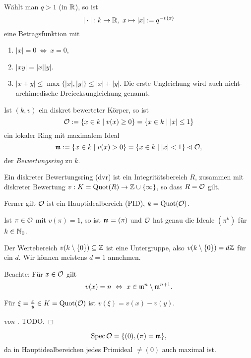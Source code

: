 \begin{bemerkung}
	Wählt man $q > 1$ (in $\mathbb{R}$), so ist
	\[
		|\cdot |: k \to \mathbb{R},\ x\mapsto |x| := q^{-v(x)}
	\]
	eine Betragsfunktion mit
	\begin{enumerate}
	  \item $|x| = 0 \ \Leftrightarrow\ x = 0$,
	  \item $|xy| = |x||y|$.
	  \item $|x+y| \leq \max \{ |x|,|y|\} \leq |x| + |y|$.
	   Die erste Ungleichung wird auch nicht-archimedische
	   Dreiecksungleichung genannt.
	\end{enumerate}
\end{bemerkung}


\begin{definition}[Bewertungsring]
	\label{def:bewertungsring}
	Ist $(k,v)$ ein diskret bewerteter Körper, so ist
	\[
		\mathcal{O}:= \{x\in k\mid v(x) \geq 0 \} = \{ x \in k \mid |x|\leq 1\}
	\]
	ein lokaler Ring mit maximalem Ideal
	\[
		\mathfrak{m} := \{x\in k\mid v(x) > 0\} = \{ x \in k\mid |x|< 1\} \vartriangleleft \mathcal{O},
	\]
	der \emph{Bewertungsring} zu $k$.
	
	Ein diskreter Bewertungsring (dvr) ist ein Integritätsbereich $R$,
	zusammen mit diskreter Bewertung $v: K = \operatorname{Quot}(R) \to \mathbb{Z} \cup \{\infty\}$,
	so dass $R = \mathcal{O}$ gilt.
	
	Ferner gilt $\mathcal{O}$ ist ein Hauptidealbereich (PID), $k = \operatorname{Quot}(\mathcal{O})$.
	
	Ist $\pi\in \mathcal{O}$ mit $v(\pi) = 1$, so ist 
	$\mathfrak{m} = (\pi)$ und $\mathcal{O}$ hat genau die Ideale $(\pi^k)$ für $k\in \mathbb{N}_0$.
\end{definition}


\begin{bemerkung}
	Der Wertebereich $v(k\setminus \{0\}) \subseteq \mathbb{Z}$ ist eine Untergruppe,
	also $v(k\setminus \{0\}) = d \mathbb{Z}$ für ein $d$. 
	Wir können meistens \obda $d = 1$ annehmen.	
\end{bemerkung}

\begin{bemerkung}
	Beachte: Für $x\in \mathcal{O}$ gilt
	\[ v(x) = n \ \Leftrightarrow \ x \in \mathfrak{m}^n \setminus \mathfrak{m}^{n+1}. \]
	
	Für $\xi = \frac x y \in K = \operatorname{Quot}(\mathcal{O})$ ist $v(\xi) = v(x) - v(y)$.
\end{bemerkung}


\begin{proof}[von ]
	TODO.
\end{proof}

\begin{bemerkung}
	\[\operatorname{Spec} \mathcal{O} = \{(0), (\pi) = \mathfrak{m} \},\]
	da in Hauptidealbereichen jedes Primideal $\neq (0)$ auch maximal ist.
\end{bemerkung}

